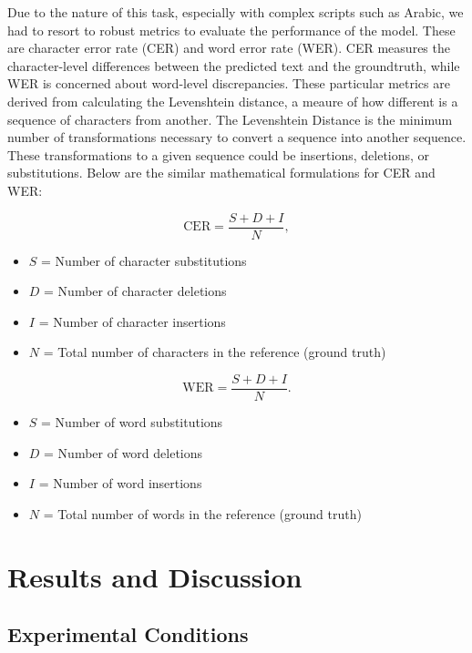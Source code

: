 \documentclass[conference]{IEEEtran}
\newcounter{customsubsubsection} %
\let\oldsubsection\subsection
\renewcommand{\subsection}[1]{%
  \oldsubsection{#1}%
  \setcounter{customsubsubsection}{0}%
}
\begin{document}
Due to the nature of this task, especially with complex scripts such as Arabic, we had to resort to robust metrics to evaluate the performance of the model. These are character error rate (CER) and word error rate (WER). CER measures the character-level differences between the predicted text and the groundtruth, while WER is concerned about word-level discrepancies. These particular metrics are derived from calculating the Levenshtein distance, a meaure of how different is a sequence of characters from another. The Levenshtein Distance is the minimum number of transformations necessary to convert a sequence into another sequence. These transformations to a given sequence could be insertions, deletions, or substitutions. Below are the similar mathematical formulations for CER and WER:


\begin{equation}
  \text{CER} = \frac{S + D + I}{N},
\end{equation}

\begin{itemize}
\item \( S \) = Number of character substitutions
\item \( D \) = Number of character deletions
\item \( I \) = Number of character insertions
\item \( N \) = Total number of characters in the reference (ground truth)
\end{itemize}

\begin{equation}
  \text{WER} = \frac{S + D + I}{N}.
\end{equation}

\begin{itemize}
\item \( S \) = Number of word substitutions
\item \( D \) = Number of word deletions
\item \( I \) = Number of word insertions
\item \( N \) = Total number of words in the reference (ground truth)
\end{itemize}

\section{Results and Discussion}
\subsection{Experimental Conditions}
\end{document}
